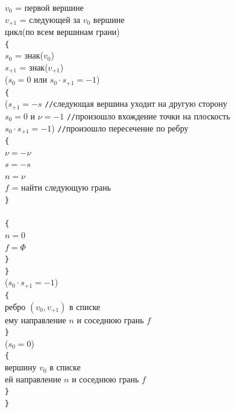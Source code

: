 \documentclass[a4paper,12pt, titlepage]{article}
\begin{document}
	\begin{flushleft}
		$v_{0}$ = первой вершине\\
		$v_{+1}$ = следующей за $v_{0}$ вершине\\
		цикл(по всем вершинам грани)\\
		\verb"{"\\
		\quad$s_{0}$ = знак($v_{0}$)\\
		\quad$s_{+1}$ = знак($v_{+1}$)\\
		($s_{0} = 0$ или $s_{0} \cdot s_{+1} = -1$)\\
		\quad\verb"{"\\
		\quad{}($s_{+1} = -s$ \quad\verb"//"следующая вершина уходит на другую сторону\\
		\quad\quad{} $s_{0} = 0$ и $\nu = -1$ \quad\verb"//"произошло вхождение точки на плоскость\\
		\quad\quad{} $s_{0} \cdot s_{+1} = -1$) \quad\verb"//"произошло пересечение по ребру\\
		\quad\quad\verb"{"\\
		\quad\quad\quad$\nu = -\nu$\\
		\quad\quad\quad$s = -s$\\
		\quad\quad\quad$n = \nu$\\
		\quad\quad\quad$f$ = найти следующую грань\\
		\quad\quad\verb"}"\\
		\quad\quadиначе\\
		\quad\quad\verb"{"\\
		\quad\quad\quad$n = 0$\\
		\quad\quad\quad$f = \Phi$\\
		\quad\quad\verb"}"\\
		\quad\verb"}"\\
		($s_{0} \cdot s_{+1} = -1$)\\
		\quad\verb"{"\\
		\quad{} ребро $(v_{0}, v_{+1})$ в списке\\
		\quad{} ему направление $n$ и соседнюю грань $f$\\
		\quad\verb"}"\\
		($s_{0} = 0$)\\
		\quad\verb"{"\\
		\quad{} вершину $v_{0}$ в списке\\
		\quad{} ей направление $n$ и соседнюю грань $f$\\
		\quad\verb"}"\\
		\verb"}"\\
	\end{flushleft}
\end{document}

